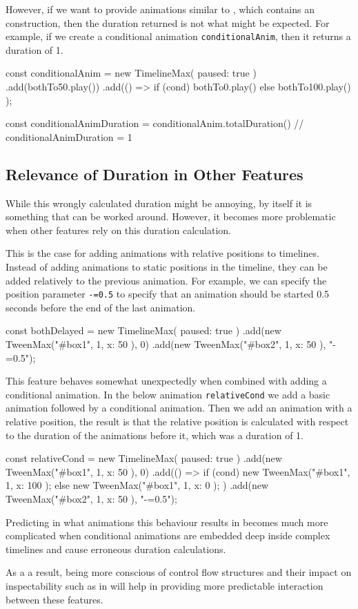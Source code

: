 However, if we want to provide animations similar to , which contains an  construction, then the duration returned is not what might be expected. For example, if we create a conditional animation \texttt{conditionalAnim}, then it returns a duration of 1.

\begin{js}
const conditionalAnim = new TimelineMax({ paused: true })
  .add(bothTo50.play())
  .add(() => { if (cond) { bothTo0.play()
               } else { bothTo100.play() } });

const conditionalAnimDuration = conditionalAnim.totalDuration()
// conditionalAnimDuration = 1
\end{js}

\subsection{Relevance of Duration in Other Features}

While this wrongly calculated duration might be annoying, by itself it is something that can be worked around. However, it becomes more problematic when other features rely on this duration calculation.

This is the case for adding animations with relative positions to timelines. Instead of adding animations to static positions in the timeline, they can be added relatively to the previous animation. For example, we can specify the position parameter \texttt{-=0.5} to specify that an animation should be started 0.5 seconds before the end of the last animation.

\begin{js}
const bothDelayed = new TimelineMax({ paused: true })
  .add(new TweenMax("#box1", 1, { x: 50 }), 0)
  .add(new TweenMax("#box2", 1, { x: 50 }), "-=0.5");
\end{js}

This feature behaves somewhat unexpectedly when combined with adding a conditional animation. In the below animation \texttt{relativeCond} we add a basic animation followed by a conditional animation. Then we add an animation with a relative position, the result is that the relative position is calculated with respect to the duration of the animations before it, which was a duration of 1.

\begin{js}
const relativeCond = new TimelineMax({ paused: true })
  .add(new TweenMax("#box1", 1, { x: 50 }), 0)
  .add(() => { if (cond) { new TweenMax("#box1", 1, { x: 100 });
               } else { new TweenMax("#box1", 1, { x: 0 }); } })
  .add(new TweenMax("#box2", 1, { x: 50 }), "-=0.5");
\end{js}

Predicting in what animations this behaviour results in becomes much more complicated when conditional animations are embedded deep inside complex timelines and cause erroneous duration calculations.

As a a result, being more conscious of control flow structures and their impact on inspectability such as in \dsl{} will help in providing more predictable interaction between these features.

